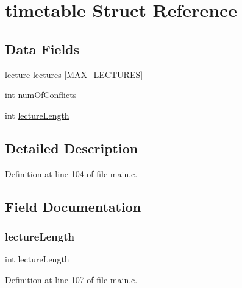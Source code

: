 \hypertarget{structtimetable}{}\section{timetable Struct Reference}
\label{structtimetable}
\subsection*{Data Fields}
\begin{DoxyCompactItemize}
\item 
\hyperlink{structlecture}{lecture} \hyperlink{structtimetable_a8a1f2b07250a066ed40e601dcb3c7da2}{lectures} \mbox{[}\hyperlink{main_8c_a152499a7a91751df0c7f203a60a88003}{M\+A\+X\+\_\+\+L\+E\+C\+T\+U\+R\+ES}\mbox{]}
\item 
int \hyperlink{structtimetable_a6b5984c472886301ccaf88155193b2fa}{num\+Of\+Conflicts}
\item 
int \hyperlink{structtimetable_ab137018dfc1d330a3a218446dbe4d4cb}{lecture\+Length}
\end{DoxyCompactItemize}


\subsection{Detailed Description}


Definition at line 104 of file main.\+c.



\subsection{Field Documentation}
\hypertarget{structtimetable_ab137018dfc1d330a3a218446dbe4d4cb}{}\label{structtimetable_ab137018dfc1d330a3a218446dbe4d4cb} 
\subsubsection{\texorpdfstring{lecture\+Length}{lectureLength}}
{\footnotesize\ttfamily int lecture\+Length}



Definition at line 107 of file main.\+c.

\hypertarget{structtimetable_a8a1f2b07250a066ed40e601dcb3c7da2}{}\label{structtimetable_a8a1f2b07250a066ed40e601dcb3c7da2} 
